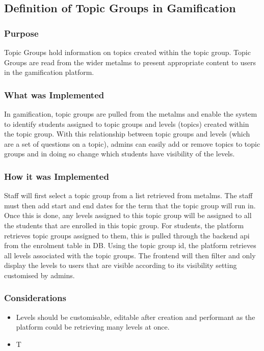 \newpage

\subsection{Definition of Topic Groups in Gamification}

\subsubsection{Purpose}
Topic Groups hold information on topics created within the topic group. Topic Groups are read from the wider metalms to present appropriate content to users in the gamification platform.

\subsubsection{What was Implemented}
In gamification, topic groups are pulled from the metalms and enable the system to identify students assigned to topic groups and levels (topics) created within the topic group. With this relationship between topic groups and levels (which are a set of questions on a topic), admins can easily add or remove topics to topic groups and in doing so change which students have visibility of the levels.

\subsubsection{How it was Implemented}
Staff will first select a topic group from a list retrieved from metalms. The staff must then add start and end dates for the term that the topic group will run in. Once this is done, any levels assigned to this topic group will be assigned to all the students that are enrolled in this topic group. For students, the platform retrieves topic groups assigned to them, this is pulled through the backend api from the enrolment table in DB. Using the topic group id, the platform retrieves all levels associated with the topic groups. The frontend will then filter and only display the levels to users that are visible according to its visibility setting customised by admins.

\subsubsection{Considerations}
\begin{itemize}
    \item Levels should be customisable, editable after creation and performant as the platform could be retrieving many levels at once.
    \item T
\end{itemize}

